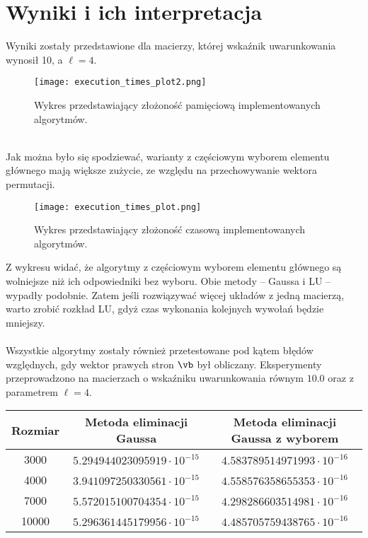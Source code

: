 \documentclass{article}
\begin{document}
\section{Wyniki i ich interpretacja}
Wyniki zostały przedstawione dla macierzy, której wskaźnik uwarunkowania wynosił 10, a $\ell = 4$.
\begin{figure}[H]
    \centering
    \texttt{[image: execution\_times\_plot2.png]}
    \caption{Wykres przedstawiający złożoność pamięciową implementowanych algorytmów.}
    \label{fig:zad5_f1_10}
\end{figure}
\\ Jak można było się spodziewać, warianty z częściowym wyborem elementu głównego mają większe zużycie, ze względu na przechowywanie wektora permutacji.
\begin{figure}[H]
    \centering
    \texttt{[image: execution\_times\_plot.png]}
    \caption{Wykres przedstawiający złożoność czasową implementowanych algorytmów.}
    \label{fig:zad5_f1_10}
\end{figure}

Z wykresu widać, że algorytmy z częściowym wyborem elementu głównego są wolniejsze niż ich odpowiedniki bez  wyboru. Obie metody -- Gaussa i LU -- wypadły podobnie. Zatem jeśli rozwiązywać więcej układów z jedną macierzą, warto zrobić rozkład LU, gdyż czas wykonania kolejnych wywołań będzie mniejszy.
\\ \\

Wszystkie algorytmy zostały również przetestowane pod kątem błędów względnych, gdy wektor prawych stron $\vb$ był obliczany. Eksperymenty przeprowadzono na macierzach o wskaźniku uwarunkowania równym $10.0$ oraz z parametrem $\ell=4$. 

\begin{table}[!htbp]
	\centering
	\begin{tabular}{|c|c|c|}
		\hline
		Rozmiar \mathbf{A} & Metoda eliminacji Gaussa & Metoda eliminacji Gaussa z wyborem   \\ \hline
		3000& $5.294944023095919\cdot 10^{-15}$ & $4.583789514971993\cdot 10^{-16}$   \\ \hline
		4000& $3.941097250330561\cdot 10^{-15}$ & $4.558576358655353\cdot 10^{-16}$    \\ \hline
		7000& $5.572015100704354\cdot 10^{-15}$ & $4.298286603514981\cdot 10^{-16}$  \\ \hline
		10000& $5.296361445179956\cdot 10^{-15}$ & $4.485705759438765\cdot 10^{-16}$ \\ \hline
	\end{tabular}
\end{table}
\end{document}
